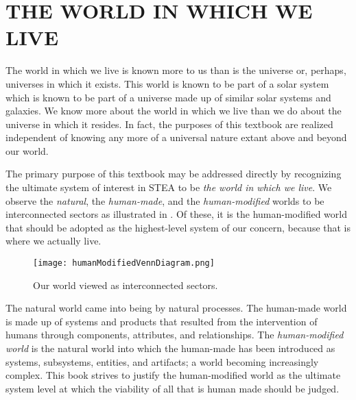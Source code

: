 \chapter{THE WORLD IN WHICH WE LIVE} \label{chap:01}

The world in which we live is known more to us than is the universe or, perhaps, universes in which it exists.  This world is known to be part of a solar system which is known to be part of a universe made up of similar solar systems and galaxies.  We know more about the world in which we live than we do about the universe in which it resides.  In fact, the purposes of this textbook are realized independent of knowing any more of a universal nature extant above and beyond our world.

The primary purpose of this textbook may be addressed directly by recognizing the ultimate system of interest in STEA to be \textit{the world in which we live}.  We observe the \textit{natural}, the \textit{human-made}, and the \textit{human-modified} worlds to be interconnected sectors as illustrated in .  Of these, it is the human-modified world that should be adopted as the highest-level system of our concern, because that is where we actually live.

\begin{figure}[h]
\centering
\texttt{[image: humanModifiedVennDiagram.png]}
\caption{Our world viewed as interconnected sectors.}
\label{fig:humanModifiedVennDiagram}
\end{figure}
    
The natural world came into being by natural processes.  The human-made world is made up of systems and products that resulted from the intervention of humans through components, attributes, and relationships.  The \textit{human-modified world} is the natural world into which the human-made has been introduced as systems, subsystems, entities, and artifacts; a world becoming increasingly complex.  This book strives to justify the human-modified world as the ultimate system level at which the viability of all that is human made should be judged.










